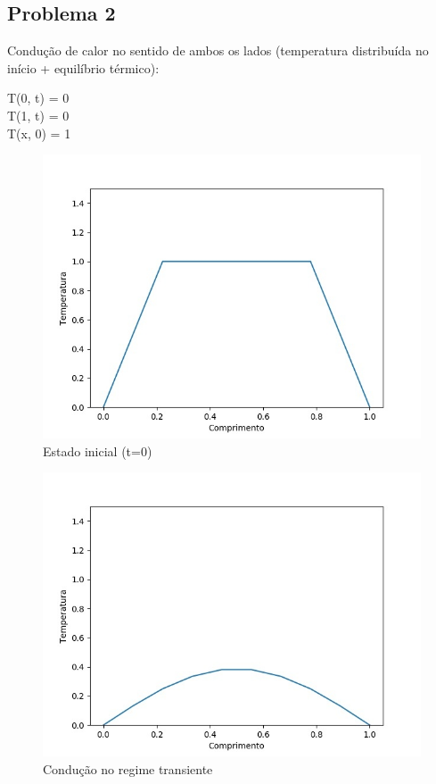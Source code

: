 \documentclass[journal]{IEEEtran}
\begin{document}
	\subsection{Problema 2}
		\par Condução de calor no sentido de ambos os lados (temperatura distribuída no início + equilíbrio térmico):
		\begin{center}
			T(0, t) = 0\\
			T(1, t) = 0\\
			T(x, 0) = 1
		\end{center}
		\begin{figure}[H]
			\begin{center}
				\includegraphics[scale=0.3]{res2-1}
				\caption{Estado inicial (t=0)}
			\end{center}
		\end{figure}
		\begin{figure}[H]
			\begin{center}
				\includegraphics[scale=0.3]{res2-2}
				\caption{Condução no regime transiente}
			\end{center}
		\end{figure}
\end{document}
